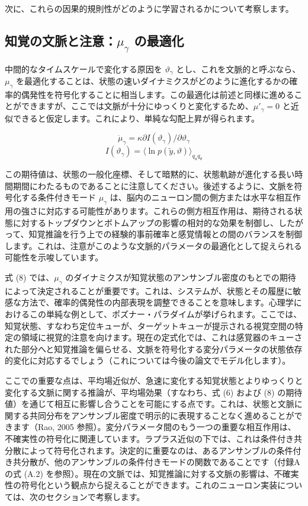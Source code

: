 \documentclass{article}
\begin{document}
次に、これらの因果的規則性がどのように学習されるかについて考察します。

\subsection{知覚の文脈と注意：$\mu_\gamma$ の最適化}
中間的なタイムスケールで変化する原因を $\vartheta_\gamma$ とし、これを文脈的と呼ぶなら、$\mu_\gamma$ を最適化することは、状態の速いダイナミクスがどのように進化するかの確率的偶発性を符号化することに相当します。この最適化は前述と同様に進めることができますが、ここでは文脈が十分にゆっくりと変化するため、$\mu'_\gamma=0$ と近似できると仮定します。これにより、単純な勾配上昇が得られます。

$$\dot{\mu}_\gamma=\kappa\partial I(\vartheta_\gamma)/\partial\vartheta_\gamma$$
$$I(\vartheta_\gamma)=\langle\ln p(\tilde{y},\vartheta)\rangle_{q_u q_\theta}$$

この期待値は、状態の一般化座標、そして暗黙的に、状態軌跡が進化する長い時間期間にわたるものであることに注意してください。後述するように、文脈を符号化する条件付きモード $\mu_\gamma$ は、脳内のニューロン間の側方または水平な相互作用の強さに対応する可能性があります。これらの側方相互作用は、期待される状態に対するトップダウンとボトムアップの影響の相対的な効果を制御し、したがって、知覚推論を行う上での経験的事前確率と感覚情報との間のバランスを制御します。これは、注意がこのような文脈的パラメータの最適化として捉えられる可能性を示唆しています。

式 (8) では、$\mu_\gamma$ のダイナミクスが知覚状態のアンサンブル密度のもとでの期待によって決定されることが重要です。これは、システムが、状態とその履歴に敏感な方法で、確率的偶発性の内部表現を調整できることを意味します。心理学におけるこの単純な例として、ポズナー・パラダイムが挙げられます。ここでは、知覚状態、すなわち定位キューが、ターゲットキューが提示される視覚空間の特定の領域に視覚的注意を向けます。現在の定式化では、これは感覚器のキューされた部分へと知覚推論を偏らせる、文脈を符号化する変分パラメータの状態依存的変化に対応するでしょう（これについては今後の論文でモデル化します）。

ここでの重要な点は、平均場近似が、急速に変化する知覚状態とよりゆっくりと変化する文脈に関する推論が、平均場効果（すなわち、式 (6) および (8) の期待値）を通じて相互に影響し合うことを可能にする点です。これは、状態と文脈に関する共同分布をアンサンブル密度で明示的に表現することなく進めることができます（Rao, 2005 参照）。変分パラメータ間のもう一つの重要な相互作用は、不確実性の符号化に関連しています。ラプラス近似の下では、これは条件付き共分散によって符号化されます。決定的に重要なのは、あるアンサンブルの条件付き共分散が、他のアンサンブルの条件付きモードの関数であることです（付録Aの式 (A.2) を参照）。現在の文脈では、知覚推論に対する文脈の影響は、不確実性の符号化という観点から捉えることができます。これのニューロン実装については、次のセクションで考察します。
\end{document}

